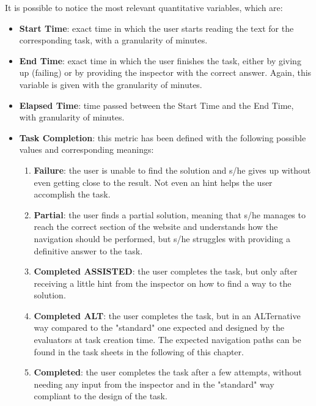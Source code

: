 \clearpage
It is possible to notice the most relevant quantitative variables, which are:
\begin{itemize}
	\item \textbf{Start Time}: exact time in which the user starts reading the text for the corresponding task, with a granularity of minutes.
	\item \textbf{End Time}: exact time in which the user finishes the task, either by giving up (failing) or by providing the inspector with the correct answer. Again, this variable is given with the granularity of minutes.
	\item \textbf{Elapsed Time}: time passed between the Start Time and the End Time, with granularity of minutes.
	\item \textbf{Task Completion}: this metric has been defined with the following possible values and corresponding meanings:
		\begin{enumerate}
			\item \textbf{Failure}: the user is unable to find the solution and s/he gives up without even getting close to the result. Not even an hint helps the user accomplish the task.
			\item \textbf{Partial}: the user finds a partial solution, meaning that s/he manages to reach the correct section of the website and understands how the navigation should be performed, but s/he struggles with providing a definitive answer to the task.
			\item \textbf{Completed ASSISTED}: the user completes the task, but only after receiving a little hint from the inspector on how to find a way to the solution.
			\item \textbf{Completed ALT}: the user completes the task, but in an ALTernative way compared to the "standard" one expected and designed by the evaluators at task creation time. The expected navigation paths can be found in the task sheets in the following of this chapter.
			\item \textbf{Completed}: the user completes the task after a few attempts, without needing any input from the inspector and in the "standard" way compliant to the design of the task.
		\end{enumerate}
\end{itemize}

